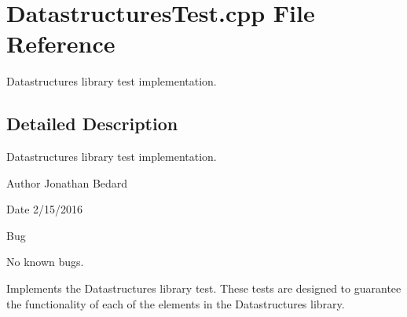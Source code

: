 \section{Datastructures\+Test.\+cpp File Reference}
\label{DatastructuresTest_8cpp}


Datastructures library test implementation.  




\subsection{Detailed Description}
Datastructures library test implementation. 

\begin{DoxyAuthor}{Author}
Jonathan Bedard 
\end{DoxyAuthor}
\begin{DoxyDate}{Date}
2/15/2016 
\end{DoxyDate}
\begin{DoxyRefDesc}{Bug}
\item[{\bf Bug}]No known bugs.\end{DoxyRefDesc}


Implements the Datastructures library test. These tests are designed to guarantee the functionality of each of the elements in the Datastructures library. 